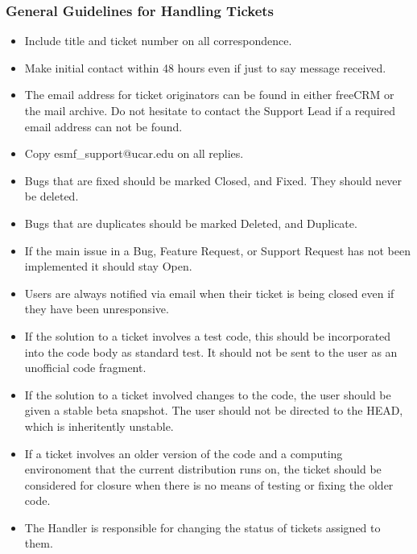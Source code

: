 \subsubsection{General Guidelines for Handling Tickets}
\begin{itemize}
\item Include title and ticket number on all correspondence.
\item Make initial contact within 48 hours even if just to say message received.
\item The email address for ticket originators can be found in either freeCRM or the mail archive. Do not hesitate to contact the Support Lead if a required email address can not be found. 
\item Copy esmf\_support@ucar.edu on all replies.
\item Bugs that are fixed should be marked Closed, and Fixed. They should never be deleted. 
\item Bugs that are duplicates should be marked Deleted, and Duplicate. 
\item If the main issue in a Bug, Feature Request, or Support Request has not been implemented it should stay Open.
\item Users are always notified via email when their ticket is being closed even if they have been unresponsive.  
\item If the solution to a ticket involves a test code, this should be incorporated into the code body as standard test. It should not be sent to the user as an unofficial code fragment. 
\item If the solution to a ticket involved changes to the code, the user should be given a stable beta snapshot. The user should not be directed to the HEAD, which is inheritently unstable.  
\item If a ticket involves an older version of the code and a computing environoment that the current distribution runs on, the ticket should be considered for closure when there is no means of testing or fixing the older code. 
\item The Handler is responsible for changing the status of tickets assigned to them.  
\end{itemize}

